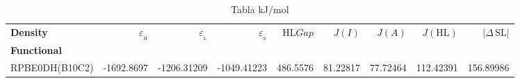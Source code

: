 \documentclass[preprint,landscape,12pt]{elsarticle}
\begin{document}
	\begin{table}
		\caption{ Tabla kJ/mol}
		\centering
		\footnotesize
		\begin{tabular}{lrrrrrrrr}
			\hline
			\textbf{Density}    & $\varepsilon_{_{\mathrm{H}}}$	& $\varepsilon_{_{\mathrm{L}}}$  & $\varepsilon_{_{\mathrm{S}}}$& HL$Gap$ & $J(I)$ & $J(A)$ & $J(\mathrm{HL})$  & \textbf{$\left|\Delta\,\mathrm{SL}\right|$}  \\
			\textbf{Functional} &   &  &     &   &  &  &  &  \\
			\hline \hline 

RPBE0DH(B10C2) & -1692.8697 & -1206.31209 & -1049.41223 & 486.5576 & 81.22817 & 77.72464 & 112.42391 & 156.89986\\

	 		\hline
		\end{tabular}
			\label{tab:kJ/mol}
	\end{table}
\end{document}
